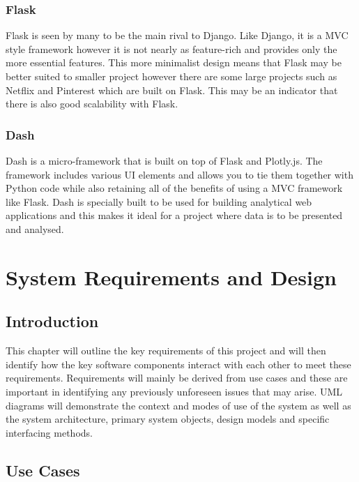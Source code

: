 \documentclass[10pt,a4paper]{article}
\begin{document}
\subsubsection{Flask}
Flask\cite{website:flask} is seen by many to be the main rival to Django. Like Django, it is a MVC style framework however it is not nearly as feature-rich and provides only the more essential features. This more minimalist design means that Flask may be better suited to smaller project however there are some large projects such as Netflix and Pinterest which are built on Flask. This may be an indicator that there is also good scalability with Flask. 
\subsubsection{Dash}
Dash\cite{website:dash} is a micro-framework that is built on top of Flask and Plotly.js. The framework includes various UI elements and allows you to tie them together with Python code while also retaining all of the benefits of using a MVC framework like Flask. Dash is specially built to be used for building analytical web applications and this makes it ideal for a project where data is to be presented and analysed. 

\pagebreak
\section{System Requirements and Design}
\subsection{Introduction}
This chapter will outline the key requirements of this project and will then identify how the key software components interact with each other to meet these requirements. Requirements will mainly be derived from use cases and these are important in identifying any previously unforeseen issues that may arise. UML diagrams will demonstrate the context and modes of use of the system as well as the system architecture, primary system objects, design models and specific interfacing methods. 

\subsection{Use Cases}
\end{document}
